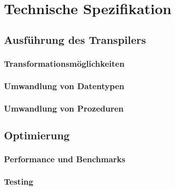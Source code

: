 \section{Technische Spezifikation}
	\subsection{Ausführung des Transpilers}
		\subsubsection{Transformationsmöglichkeiten}
		\subsubsection{Umwandlung von Datentypen}
		\subsubsection{Umwandlung von Prozeduren}
	\subsection{Optimierung}
		\subsubsection{Performance und Benchmarks}
		\subsubsection{Testing}
